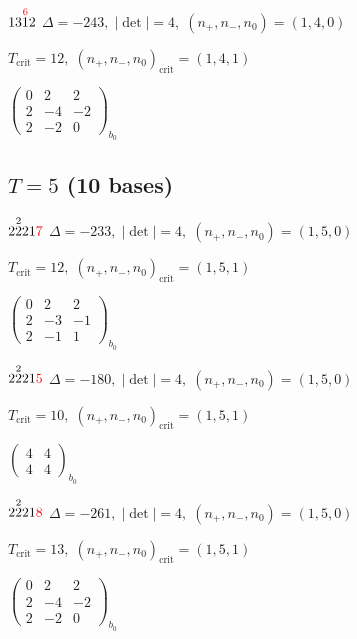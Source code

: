 \documentclass[10pt]{article}
\begin{document}
$13\overset{\textcolor{red}{6}}{1}2$ \quad $\Delta=-243,\; |\det|=4,\; (n_+,n_-,n_0)=(1,4,0)$

\hspace{1em}$T_{\text{crit}}=12,\; (n_+,n_-,n_0)_{\text{crit}}=(1,4,1)$

\hspace{2em}$\left(\begin{smallmatrix}0 & 2 & 2 \\ 2 & -4 & -2 \\ 2 & -2 & 0\end{smallmatrix}\right)_{\!b_0}$


\subsection*{$T = 5$ \quad (10 bases)}
\smallskip

$2\overset{2}{2}21\textcolor{red}{7}$ \quad $\Delta=-233,\; |\det|=4,\; (n_+,n_-,n_0)=(1,5,0)$

\hspace{1em}$T_{\text{crit}}=12,\; (n_+,n_-,n_0)_{\text{crit}}=(1,5,1)$

\hspace{2em}$\left(\begin{smallmatrix}0 & 2 & 2 \\ 2 & -3 & -1 \\ 2 & -1 & 1\end{smallmatrix}\right)_{\!b_0}$

$2\overset{2}{2}21\textcolor{red}{5}$ \quad $\Delta=-180,\; |\det|=4,\; (n_+,n_-,n_0)=(1,5,0)$

\hspace{1em}$T_{\text{crit}}=10,\; (n_+,n_-,n_0)_{\text{crit}}=(1,5,1)$

\hspace{2em}$\left(\begin{smallmatrix}4 & 4 \\ 4 & 4\end{smallmatrix}\right)_{\!b_0}$

$2\overset{2}{2}21\textcolor{red}{8}$ \quad $\Delta=-261,\; |\det|=4,\; (n_+,n_-,n_0)=(1,5,0)$

\hspace{1em}$T_{\text{crit}}=13,\; (n_+,n_-,n_0)_{\text{crit}}=(1,5,1)$

\hspace{2em}$\left(\begin{smallmatrix}0 & 2 & 2 \\ 2 & -4 & -2 \\ 2 & -2 & 0\end{smallmatrix}\right)_{\!b_0}$
\end{document}
